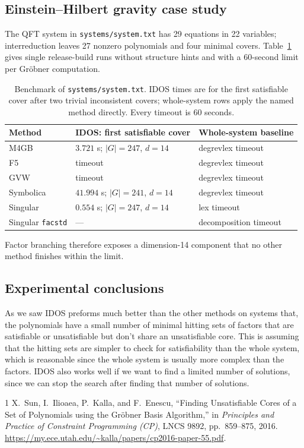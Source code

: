 \documentclass[12pt]{article}
\begin{document}
\subsection*{Einstein--Hilbert gravity case study}

The QFT system in \texttt{systems/system.txt} has 29 equations in 22
variables; interreduction leaves 27 nonzero polynomials and four minimal
covers.  Table~\ref{tab:qft-system} gives single release-build runs without
structure hints and with a 60-second limit per Gr\"obner computation.

\begin{table}[htbp]
\centering
\small
\setlength{\tabcolsep}{5pt}
\begin{tabular}{l l l}
\toprule
Method & IDOS: first satisfiable cover & Whole-system baseline \\
\midrule
M4GB & $3.721$ s; $|G|=247$, $d=14$ & degrevlex timeout \\
F5 & timeout & degrevlex timeout \\
GVW & timeout & degrevlex timeout \\
Symbolica & $41.994$ s; $|G|=241$, $d=14$ & degrevlex timeout \\
Singular & $0.554$ s; $|G|=247$, $d=14$ & lex timeout \\
Singular \texttt{facstd} & --- & decomposition timeout \\
\bottomrule
\end{tabular}
\caption{Benchmark of \texttt{systems/system.txt}.  IDOS times are for the
first satisfiable cover after two trivial inconsistent covers; whole-system
rows apply the named method directly.  Every timeout is 60 seconds.}
\label{tab:qft-system}
\end{table}

Factor branching therefore exposes a dimension-14 component that no other method finishes within the limit.

\subsection*{Experimental conclusions}
As we saw IDOS preforms much better than the other methods on systems that, the polynomials have a small number of minimal hitting sets of factors that are satisfiable or unsatisfiable but don't share an unsatisfiable core.
This is assuming that the hitting sets are simpler to check for satisfiability than the whole system, which is reasonable since the whole system is usually more complex than the factors.
IDOS also works well if we want to find a limited number of solutions, since we can stop the search after finding that number of solutions.

\begin{thebibliography}{1}
X.~Sun, I.~Ilioaea, P.~Kalla, and F.~Enescu,
\newblock ``Finding Unsatisfiable Cores of a Set of Polynomials using the
Gr\"obner Basis Algorithm,''
\newblock in \emph{Principles and Practice of Constraint Programming (CP)},
LNCS 9892, pp.~859--875, 2016.
\newblock \url{https://my.ece.utah.edu/~kalla/papers/cp2016-paper-55.pdf}.
\end{thebibliography}
\end{document}
